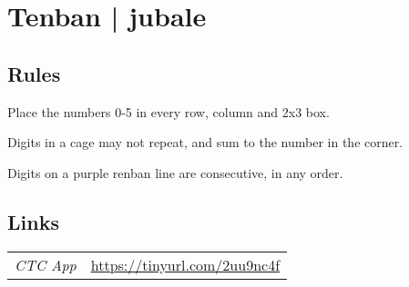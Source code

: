 \section{Tenban | {\normalfont jubale}}
\label{sec:44-tenban-jubale}

\subsection*{Rules}
\begin{markdown}
Place the numbers 0-5 in every row, column and 2x3 box.



Digits in a cage may not repeat, and sum to the number in the corner.



Digits on a purple renban line are consecutive, in any order.
\end{markdown}
\subsection*{Links}
\begin{tabularx}{\textwidth}{l X}
\emph{CTC App} & \url{https://tinyurl.com/2uu9nc4f} \\
\end{tabularx}
\pagebreak
